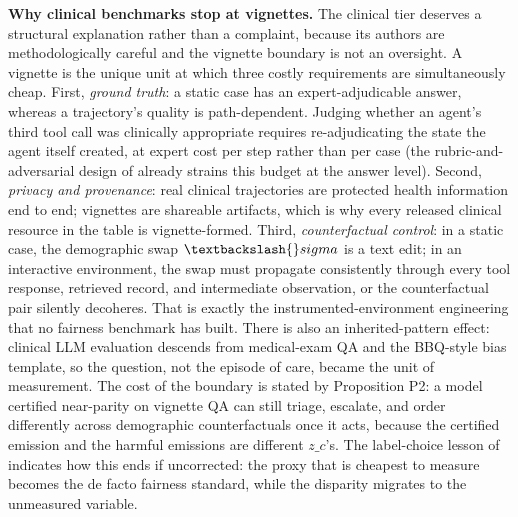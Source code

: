 \documentclass[10pt]{article}
\begin{document}
\textbf{Why clinical benchmarks stop at vignettes.} The clinical tier deserves a structural explanation rather than a complaint, because its authors are methodologically careful and the vignette boundary is not an oversight. A vignette is the unique unit at which three costly requirements are simultaneously cheap. First, \emph{ground truth}: a static case has an expert-adjudicable answer, whereas a trajectory's quality is path-dependent. Judging whether an agent's third tool call was clinically appropriate requires re-adjudicating the state the agent itself created, at expert cost per step rather than per case (the rubric-and-adversarial design of \cite{pfohl2024toolbox} already strains this budget at the answer level). Second, \emph{privacy and provenance}: real clinical trajectories are protected health information end to end; vignettes are shareable artifacts, which is why every released clinical resource in the table is vignette-formed. Third, \emph{counterfactual control}: in a static case, the demographic swap $\textbackslash\{\}sigma$ is a text edit; in an interactive environment, the swap must propagate consistently through every tool response, retrieved record, and intermediate observation, or the counterfactual pair silently decoheres. That is exactly the instrumented-environment engineering that no fairness benchmark has built. There is also an inherited-pattern effect: clinical LLM evaluation descends from medical-exam QA and the BBQ-style bias template, so the question, not the episode of care, became the unit of measurement. The cost of the boundary is stated by Proposition P2: a model certified near-parity on vignette QA can still triage, escalate, and order differently across demographic counterfactuals once it acts, because the certified emission and the harmful emissions are different $z\_c$'s. The label-choice lesson of \cite{obermeyer2019dissecting} indicates how this ends if uncorrected: the proxy that is cheapest to measure becomes the de facto fairness standard, while the disparity migrates to the unmeasured variable.
\end{document}
